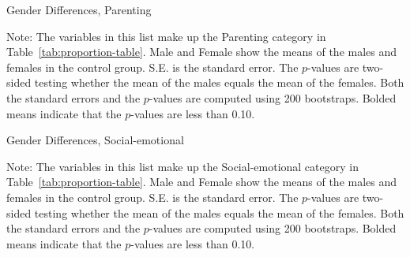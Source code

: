 \begin{table}
\centering
\caption{Gender Differences, Parenting}\label{tab:tab1-home}
\begin{adjustbox}{width=0.8\textwidth}
\begin{threeparttable}

\begin{tablenotes}
\footnotesize
\item Note: The variables in this list make up the Parenting category in Table~\ref{tab:proportion-table}. Male and Female show the means of the males and females in the control group. S.E. is the standard error. The $p$-values are two-sided testing whether the mean of the males equals the mean of the females. Both the standard errors and the $p$-values are computed using 200 bootstraps. Bolded means indicate that the $p$-values are less than 0.10.
\end{tablenotes}
\end{threeparttable}
\end{adjustbox}
\end{table}


\begin{table}
\centering
\caption{Gender Differences, Social-emotional}\label{tab:tab1-se}
\begin{adjustbox}{width=0.625\textwidth}
\begin{threeparttable}

\begin{tablenotes}
\footnotesize
\item Note: The variables in this list make up the Social-emotional category in Table~\ref{tab:proportion-table}. Male and Female show the means of the males and females in the control group. S.E. is the standard error. The $p$-values are two-sided testing whether the mean of the males equals the mean of the females. Both the standard errors and the $p$-values are computed using 200 bootstraps. Bolded means indicate that the $p$-values are less than 0.10.
\end{tablenotes}
\end{threeparttable}
\end{adjustbox}
\end{table}

